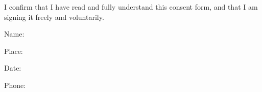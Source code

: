 
\noindent I confirm that I have read and fully understand this consent form, and that I am signing it freely and voluntarily.

\vspace{0.5in}

\vspace{0.2in}
\hspace{3in}
Name: \deponentName{}

\vspace{0.2in}

\hspace{3in}
\parbox{3.5in}{
Place: \affidavitPlace{}
}
\vspace{0.2in}

\hspace{3in}
Date: \affidavitDate{}

\vspace{0.2in}

\hspace{3in}
Phone: \deponentPhone{}

